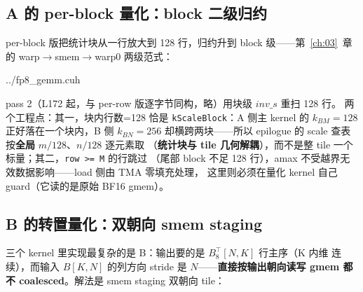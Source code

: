 \subsection{A 的 per-block 量化：block 二级归约}

per-block 版把统计块从一行放大到 128 行，归约升到 block 级——第~\ref{ch:03}~章
的 warp$\to$smem$\to$warp0 两级范式：

\begin{lstinputlisting}[linerange={131-170},firstnumber=auto,
  title={fp8\_gemm.cuh L131-170（quantize\_a\_perblock\_kernel：128 行块 amax 两级归约）}]{../fp8_gemm.cuh}
\end{lstinputlisting}

pass 2（L172 起，与 per-row 版逐字节同构，略）用块级 $inv\_s$ 重扫 128 行。
两个工程点：其一，块内行数=128 恰是 \texttt{kScaleBlock}：A 侧主 kernel 的
$k_{BM}{=}128$ 正好落在一个块内，B 侧 $k_{BN}{=}256$ 却横跨两块——所以
epilogue 的 scale 查表按\textbf{全局} $m/128$、$n/128$ 逐元素取
（\textbf{统计块与 tile 几何解耦}），而不是整 tile 一个标量；其二，\texttt{row >= M} 的行跳过
（尾部 block 不足 128 行），amax 不受越界无效数据影响——load 侧由 TMA 零填充处理，
这里则必须在量化 kernel 自己 guard（它读的是原始 BF16 gmem）。

\subsection{B 的转置量化：双朝向 smem staging}\label{sec:34-bt}

三个 kernel 里实现最复杂的是 B：输出要的是 $B_8^{\top}[N,K]$ 行主序（K 内维
连续），而输入 $B[K,N]$ 的列方向 stride 是 $N$——\textbf{直接按输出朝向读写
gmem 都不 coalesced}。解法是 smem staging 双朝向 tile：

